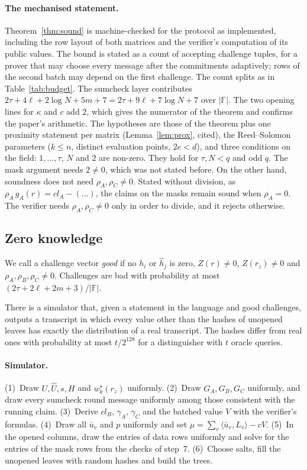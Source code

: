 \documentclass[sigconf,anonymous]{acmart}
\newcommand{\F}{\mathbb{F}}
\newcommand{\ip}[2]{\langle #1, #2\rangle}
\newcommand{\msk}[1]{#1^{\star}}
\newcommand{\hh}{\hat{h}}
\begin{document}
\paragraph{The mechanised statement.}
Theorem~\ref{thm:sound} is machine-checked for the protocol as implemented, including the row layout
of both matrices and the verifier's computation of its public values. The bound is stated as a
count of accepting challenge tuples, for a prover that may choose every message after the
commitments adaptively; rows of the second batch may depend on the first challenge. The count splits
as in Table~\ref{tab:budget}. The sumcheck layer contributes
$2\tau+4\ell+2\log N+5m+7=2\tau+9\ell+7\log N+7$ over $|\F|$. The two opening lines for $\kappa$ and
$c$ add $2$, which gives the numerator of the theorem and confirms the paper's arithmetic. The
hypotheses are those of the theorem plus one proximity statement per matrix (Lemma~\ref{lem:prox},
cited), the Reed--Solomon parameters ($k\le n$, distinct evaluation points, $2e<d$), and three
conditions on the field: $1,\dots,\tau$, $N$ and $2$ are non-zero. They hold for $\tau,N<q$ and odd
$q$. The mask argument needs $2\ne 0$, which was not stated before. On the other hand, soundness
does not need $\rho_A,\rho_C\ne 0$. Stated without division, as
$\rho_A\,g_A(r)=\mathit{cl}_A-(\ldots)$, the claims on the masks remain sound when $\rho_A=0$. The
verifier needs $\rho_A,\rho_C\ne 0$ only in order to divide, and it rejects otherwise.

\subsection{Zero knowledge}\label{sec:zk}

We call a challenge vector \emph{good} if no $h_i$ or $\hh_j$ is zero, $Z(r)\ne 0$, $Z(r_z)\ne 0$
and $\rho_A,\rho_B,\rho_C\ne 0$. Challenges are bad with probability at most
$(2\tau+2\ell+2m+3)/|\F|$.

\begin{theorem}\label{thm:zk}
There is a simulator that, given a statement in the language and good challenges, outputs a
transcript in which every value other than the hashes of unopened leaves has exactly the
distribution of a real transcript. The hashes differ from real ones with probability at most
$t/2^{128}$ for a distinguisher with $t$ oracle queries.
\end{theorem}

\paragraph{Simulator.}
(1)~Draw $U,\hat U,s,H$ and $\msk{w}_k(r_z)$ uniformly. (2)~Draw $G_A,G_B,G_C$ uniformly, and draw
every sumcheck round message uniformly among those consistent with the running claim. (3)~Derive
$\mathit{cl}_B$, $\gamma_A$, $\gamma_C$ and the batched value $V$ with the verifier's formulas.
(4)~Draw all $\bar u_v$ and $p$ uniformly and set $\mu=\sum_v\ip{\bar u_v}{L_v}-cV$. (5)~In the
opened columns, draw the entries of data rows uniformly and solve for the entries of the mask rows
from the checks of step~7. (6)~Choose salts, fill the unopened leaves with random hashes and build
the trees.
\end{document}
